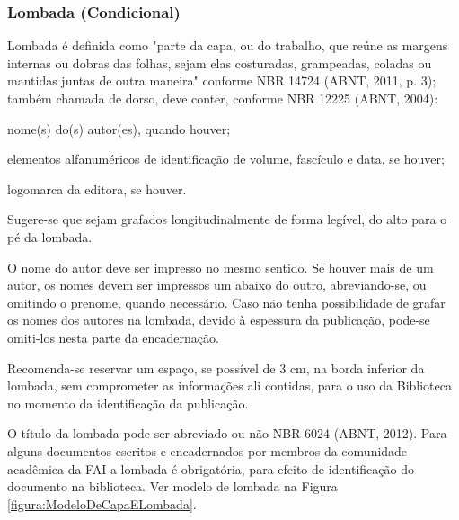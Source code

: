 \documentclass[a4paper,12pt]{article}  %
\begin{document}
\begin{ElementosTextuais}
\begin{Desenvolvimento}
\subsubsection{Lombada (Condicional)}
Lombada é definida como "parte da capa, ou do trabalho, que reúne as margens internas ou dobras das folhas, sejam elas costuradas, grampeadas, coladas ou mantidas juntas de outra maneira" conforme NBR 14724 (ABNT, 2011, p. 3); também chamada de dorso, deve conter, conforme NBR 12225 (ABNT, 2004):

\begin{alphaitemize}
  \item nome(s) do(s) autor(es), quando houver;
  \item elementos alfanuméricos de identificação de volume, fascículo e data, se houver;
  \item logomarca da editora, se houver.
\end{alphaitemize}

Sugere-se que sejam grafados longitudinalmente de forma legível, do alto para o pé da lombada.

O nome do autor deve ser impresso no mesmo sentido. Se houver mais de um autor, os nomes devem ser impressos um abaixo do outro, abreviando-se, ou omitindo o prenome, quando necessário. Caso não tenha possibilidade de grafar os nomes dos autores na lombada, devido à espessura da publicação, pode-se omiti-los nesta parte da encadernação.

Recomenda-se reservar um espaço, se possível de 3 cm, na borda inferior da lombada, sem comprometer as informações ali contidas, para o uso da Biblioteca no momento da identificação da publicação.

O título da lombada pode ser abreviado ou não NBR 6024 (ABNT, 2012). Para alguns documentos escritos e encadernados por membros da comunidade acadêmica da FAI a lombada é obrigatória, para efeito de identificação do documento na biblioteca. Ver modelo de lombada na Figura \ref{figura:ModeloDeCapaELombada}.


\end{Desenvolvimento}
\end{ElementosTextuais}
\end{document}
